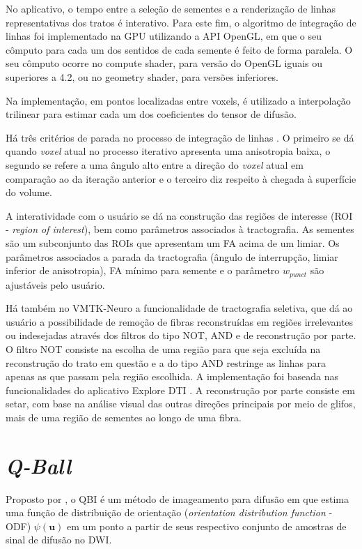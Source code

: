 \documentclass[
    12pt,                %
    oneside,            %
    a4paper,            %
    english,            %
    french,                %
    spanish,            %
    brazil                %
    ]{abntex2}
\begin{document}
No aplicativo, o tempo entre a seleção de sementes e a renderização de linhas representativas dos tratos é interativo. Para este fim, o algoritmo de integração de linhas foi implementado na GPU utilizando a API OpenGL, em que o seu cômputo para cada um dos sentidos de cada semente é feito de forma paralela. O seu cômputo ocorre no compute shader, para versão do OpenGL iguais ou superiores a 4.2, ou no geometry shader, para versões inferiores.

Na implementação, em pontos localizadas entre voxels, é utilizado a interpolação trilinear para estimar cada um dos coeficientes do tensor de difusão.

Há três critérios de parada no processo de integração de linhas \cite{basser2000}. O primeiro se dá quando \textit{voxel} atual no processo iterativo apresenta uma anisotropia baixa, o segundo se refere a uma ângulo alto entre a direção do \textit{voxel} atual em comparação ao da iteração anterior e o terceiro diz respeito à chegada à superfície do volume.

A interatividade com o usuário se dá na construção das regiões de interesse (ROI - \textit{region of interest}), bem como parâmetros associados à tractografia. As sementes são um subconjunto das ROIs que apresentam um FA acima de um limiar. Os parâmetros associados a parada da tractografia (ângulo de interrupção, limiar inferior de anisotropia), FA mínimo para semente e o parâmetro $w_{punct}$ são ajustáveis pelo usuário.


Há também no VMTK-Neuro a funcionalidade de tractografia seletiva, que dá ao usuário a possibilidade de remoção de fibras reconstruídas em regiões irrelevantes ou indesejadas através dos filtros do tipo NOT, AND e de reconstrução por parte. O filtro NOT consiste na escolha de uma região para que seja excluída na reconstrução do trato em questão e a do tipo AND restringe as linhas para apenas as que passam pela região escolhida. A implementação foi  baseada nas funcionalidades do aplicativo Explore DTI \cite{exploredti2009}. A reconstrução por parte consiste em setar, com base na análise visual das outras direções principais por meio de glifos, mais de uma região de sementes ao longo de uma fibra.

\section{\textit{Q-Ball}}

Proposto por , o QBI é um método de imageamento para difusão em que estima uma função de distribuição de orientação (\textit{orientation distribution function} - ODF) $\psi(\mathbf{u})$ em um ponto a partir de seus respectivo conjunto de amostras de sinal de difusão no DWI.
\end{document}
